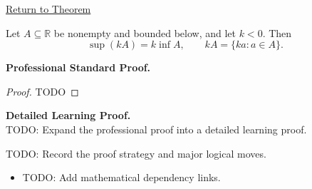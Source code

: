 \newpage
{}
\label{prf:scalar-mult-negative}

\begin{remark*}[Return]
\hyperref[thm:scalar-mult-negative]{Return to Theorem}
\end{remark*}

\begin{theorem*}
Let $A\subseteq\mathbb{R}$ be nonempty and bounded below, and let $k<0$. Then
\[
  \sup(kA)=k\inf A,
  \qquad
  kA=\{ka:a\in A\}.
\]
\end{theorem*}

\textbf{Professional Standard Proof.}~\\
\begin{proof}
TODO
\end{proof}

\textbf{Detailed Learning Proof.}~\\
TODO: Expand the professional proof into a detailed learning proof.

\begin{remark*}
TODO: Record the proof strategy and major logical moves.
\end{remark*}

\begin{dependencies}
\begin{itemize}
  \item TODO: Add mathematical dependency links.
\end{itemize}
\end{dependencies}
